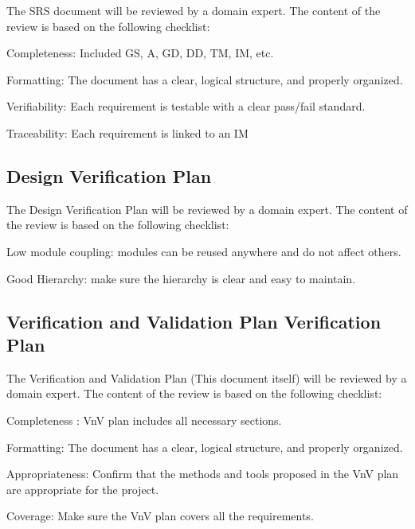 \documentclass[12pt, titlepage]{article}
\begin{document}
The SRS document \citep{SRS} will be reviewed by a domain expert.  The content
of the review is based on the following checklist:

\begin{todolist}
  \item Completeness: Included GS, A, GD, DD, TM, IM, etc.
  \item Formatting: The document has a clear, logical structure, and properly
  organized.
  \item Verifiability: Each requirement is testable with a clear pass/fail
  standard.
  \item Traceability: Each requirement is linked to an IM
\end{todolist}

\subsection{Design Verification Plan}

The Design Verification Plan will be reviewed by a domain expert.  The content
of the review is based on the following checklist:

\begin{todolist}
  \item Low module coupling: modules can be reused anywhere and do not affect
  others.
  \item Good Hierarchy: make sure the hierarchy is clear and easy to maintain.
\end{todolist}

\subsection{Verification and Validation Plan Verification Plan}

The Verification and Validation Plan (This document itself) will be reviewed by
a domain expert.  The content of the review is based on the following checklist:

\begin{todolist}
  \item Completeness : VnV plan includes all necessary sections.
  \item Formatting: The document has a clear, logical structure, and properly
  organized.
  \item Appropriateness: Confirm that the methods and tools proposed in the VnV
  plan are appropriate for the project.
  \item Coverage: Make sure the VnV plan covers all the requirements.
\end{todolist}
\end{document}
